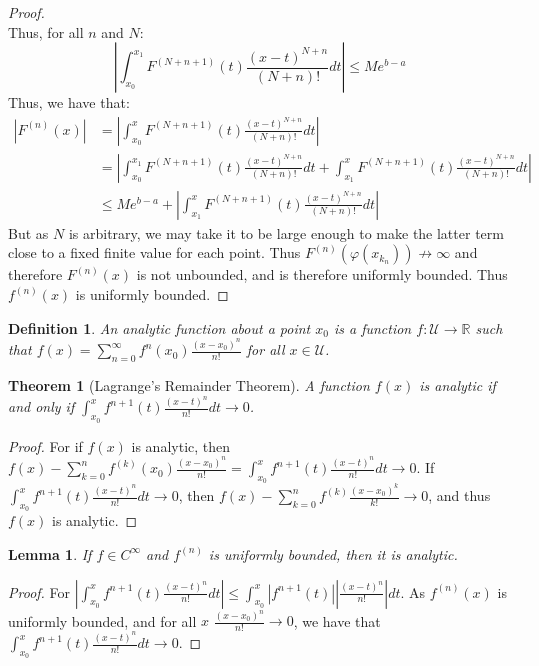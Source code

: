 \documentclass[12pt,oneside]{book}
\theoremstyle{mystyle}
\newtheorem{theorem}{Theorem}[section]
\newtheorem{definition}{Definition}[section]
\newtheorem{lemma}{Lemma}[section]
\begin{document}
\begin{proof}
\begin{equation*}
\end{equation*}
%
Thus, for all $n$ and $N$:
%
\begin{equation*}
    |\int_{x_0}^{x_1} F^{(N+n+1)}(t)\frac{(x-t)^{N+n}}{(N+n)!}dt|\leq Me^{b-a}
\end{equation*}
%
Thus, we have that:
%
\begin{align*}
    |F^{(n)}(x)| &= |\int_{x_0}^{x} F^{(N+n+1)}(t)\frac{(x-t)^{N+n}}{(N+n)!}dt|\\ &= |\int_{x_0}^{x_1} F^{(N+n+1)}(t)\frac{(x-t)^{N+n}}{(N+n)!}dt+\int_{x_1}^{x} F^{(N+n+1)}(t)\frac{(x-t)^{N+n}}{(N+n)!}dt|\\
    &\leq Me^{b-a}+|\int_{x_1}^{x} F^{(N+n+1)}(t)\frac{(x-t)^{N+n}}{(N+n)!}dt|
\end{align*}
%
But as $N$ is arbitrary, we may take it to be large enough to make the latter term close to a fixed finite value for each point. Thus $F^{(n)}(\varphi(x_{k_n}))\not\rightarrow \infty$ and therefore $F^{(n)}(x)$ is not unbounded, and is therefore uniformly bounded. Thus $f^{(n)}(x)$ is uniformly bounded.
\end{proof}

\begin{definition}
An analytic function about a point $x_0$ is a function $f:\mathcal{U}\rightarrow\mathbb{R}$ such that $f(x) = \sum_{n=0}^{\infty} f^{n}(x_0) \frac{(x-x_0)^{n}}{n!}$ for all $x\in\mathcal{U}$.
\end{definition}

\begin{theorem}[Lagrange's Remainder Theorem]
A function $f(x)$ is analytic if and only if $\int_{x_0}^{x}f^{n+1}(t)\frac{(x-t)^n}{n!}dt\rightarrow 0$.
\end{theorem}
\begin{proof}
For if $f(x)$ is analytic, then $f(x)-\sum_{k=0}^{n} f^{(k)}(x_0)\frac{(x-x_0)^n}{n!} = \int_{x_0}^{x}f^{n+1}(t)\frac{(x-t)^n}{n!}dt \rightarrow 0$. If $\int_{x_0}^{x}f^{n+1}(t)\frac{(x-t)^n}{n!}dt\rightarrow 0$, then $f(x)-\sum_{k=0}^{n}f^{(k)}\frac{(x-x_0)^{k}}{k!}\rightarrow 0$, and thus $f(x)$ is analytic.
\end{proof}

\begin{lemma}
If $f\in C^{\infty}$ and $f^{(n)}$ is uniformly bounded, then it is analytic.
\end{lemma}
\begin{proof}
For $|\int_{x_0}^{x}f^{n+1}(t)\frac{(x-t)^n}{n!}dt|\leq \int_{x_0}^{x}|f^{n+1}(t)||\frac{(x-t)^n}{n!}|dt$. As $f^{(n)}(x)$ is uniformly bounded, and for all $x$ $\frac{(x-x_0)^n}{n!} \rightarrow 0$, we have that $\int_{x_0}^{x}f^{n+1}(t)\frac{(x-t)^n}{n!}dt\rightarrow 0$.
\end{proof}
\end{document}
